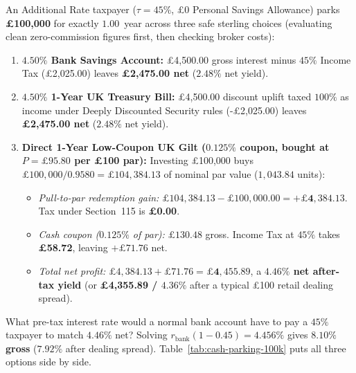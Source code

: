 \begin{example}
\label{ex:tbill-vs-gilt}
An Additional Rate taxpayer ($\tau = 45\%$, \pounds 0 Personal Savings Allowance) parks \textbf{\pounds 100,000} for exactly $1.00$~year across three safe sterling choices (evaluating clean zero-commission figures first, then checking broker costs):
\begin{enumerate}
  \item \textbf{$4.50\%$ Bank Savings Account:} \pounds 4,500.00 gross interest minus $45\%$ Income Tax (\pounds 2,025.00) leaves \textbf{\pounds 2,475.00 net} (\textbf{$2.48\%$} net yield).
  \item \textbf{$4.50\%$ 1-Year UK Treasury Bill:} \pounds 4,500.00 discount uplift taxed $100\%$ as income under Deeply Discounted Security rules (-\pounds 2,025.00) leaves \textbf{\pounds 2,475.00 net} (\textbf{$2.48\%$} net yield).
  \item \textbf{Direct 1-Year Low-Coupon UK Gilt ($0.125\%$ coupon, bought at $P = \pounds 95.80$ per \pounds 100 par):} Investing \pounds 100,000 buys $\pounds 100{,}000 / 0.9580 = \pounds 104{,}384.13$ of nominal par value ($1{,}043.84$ units):
  \begin{itemize}
    \item \emph{Pull-to-par redemption gain:} $\pounds 104{,}384.13 - \pounds 100{,}000.00 = \mathbf{+\pounds 4{,}384.13}$. Tax under Section~115 is \textbf{\pounds 0.00}.
    \item \emph{Cash coupon ($0.125\%$ of par):} $\pounds 130.48$ gross. Income Tax at $45\%$ takes \textbf{\pounds 58.72}, leaving $+\pounds 71.76$ net.
    \item \emph{Total net profit:} $\pounds 4{,}384.13 + \pounds 71.76 = \mathbf{\pounds 4{,}455.89}$, a \textbf{$4.46\%$ net after-tax yield} (or \textbf{\pounds 4,355.89 / $4.36\%$} after a typical \pounds 100 retail dealing spread).
  \end{itemize}
\end{enumerate}
What pre-tax interest rate would a normal bank account have to pay a $45\%$ taxpayer to match $4.46\%$ net? Solving $r_{\text{bank}}(1 - 0.45) = 4.456\%$ gives \textbf{$8.10\%$ gross} ($7.92\%$ after dealing spread). Table~\ref{tab:cash-parking-100k} puts all three options side by side.
\end{example}

